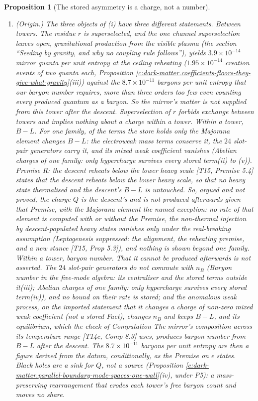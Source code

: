 \documentclass[11pt]{article}
\newtheorem{proposition}[theorem]{Proposition}
\theoremstyle{definition}
\theoremstyle{plain}
\begin{document}
\begin{proposition}[The stored asymmetry is a charge, not a number]
\begin{enumerate}
\item[(ii)] \emph{(Origin.)} The three objects of (i) have three different statements. \emph{Between towers.} The residue $r$ is superselected, and the one channel superselection leaves open, gravitational production from the visible plasma (the section ``Seeding by gravity, and why no coupling rule follows''), yields $3.9 \times 10^{-14}$ mirror quanta per unit entropy at the ceiling reheating ($1.95 \times 10^{-14}$ creation events of two quanta each, Proposition \ref{c:dark-matter.coefficients-floors-they-give-what-gravity}(iii)) against the $8.7 \times 10^{-11}$ baryons per unit entropy that our baryon number requires, more than three orders too few even counting every produced quantum as a baryon. So the mirror's matter is not supplied from this tower after the descent. Superselection of $r$ forbids exchange between towers and implies nothing about a charge within a tower. \emph{Within a tower, $B - L$.} For one family, of the terms the store holds only the Majorana element changes $B - L$: the electroweak mass terms conserve it, the $24$ slot-pair generators carry it, and its mixed weak coefficient vanishes (\emph{Abelian charges of one family: only hypercharge survives every stored term}(ii) to (v)). Premise \emph{R: the descent reheats below the lower heavy scale} [T15, Premise 5.4] states that the descent reheats below the lower heavy scale, so that no heavy state thermalised and the descent's $B - L$ is untouched. So, argued and not proved, the charge $Q$ is the descent's and is not produced afterwards given that Premise, with the Majorana element the named exception: no rate of that element is computed with or without the Premise, the non-thermal injection by descent-populated heavy states vanishes only under the real-breaking assumption (\emph{Leptogenesis suppressed: the alignment, the reheating premise, and a new stance} [T15, Prop 5.3]), and nothing is shown beyond one family. \emph{Within a tower, baryon number.} That it cannot be produced afterwards is not asserted. The $24$ slot-pair generators do not commute with $n_{B}$ (\emph{Baryon number in the five-mode algebra: its centraliser and the stored terms outside it}(iii); \emph{Abelian charges of one family: only hypercharge survives every stored term}(iv)), and no bound on their rate is stored; and the anomalous weak process, on the imported statement that it changes a charge of non-zero mixed weak coefficient (not a stored Fact), changes $n_{B}$ and keeps $B - L$, and its equilibrium, which the check of Computation \emph{The mirror's composition across its temperature range} [T14c, Comp 8.3] uses, produces baryon number from $B - L$ after the descent. The $8.7 \times 10^{-11}$ baryons per unit entropy are then a figure derived from the datum, conditionally, as the Premise on $\epsilon$ states. Black holes are a sink for $Q$, not a source (Proposition \ref{c:dark-matter.parallel-boundary-mode-spaces-one-wall}(iv), under P5): a mass-preserving rearrangement that erodes each tower's free baryon count and moves no share.

\end{enumerate}
\end{proposition}
\end{document}
